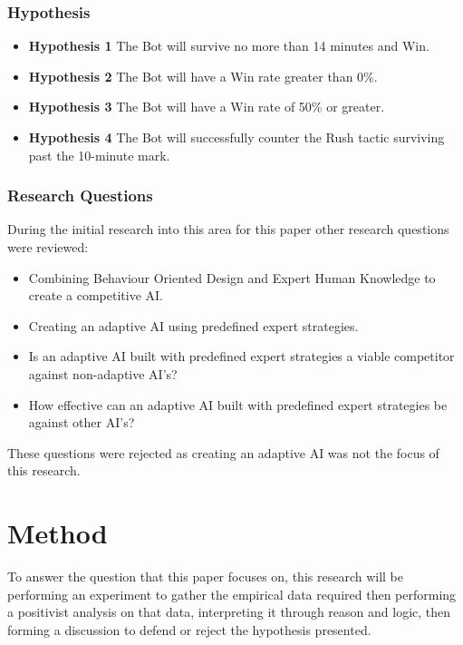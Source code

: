 \documentclass[journal]{IEEEtran}
\begin{document}
	\subsubsection{Hypothesis}
	\begin{itemize}
		\item \textbf{Hypothesis 1} The Bot will survive no more than 14 minutes and Win.
		\item \textbf{Hypothesis 2} The Bot will have a Win rate greater than 0\%.
		\item \textbf{Hypothesis 3} The Bot will have a Win rate of 50\% or greater.    
		\item \textbf{Hypothesis 4} The Bot will successfully counter the Rush tactic surviving past the 10-minute mark.
	\end{itemize}
	
	\subsubsection{Research Questions}
	During the initial research into this area for this paper other research questions were reviewed:
	\begin{itemize}
		\item Combining Behaviour Oriented Design and Expert Human Knowledge to create a competitive AI.
		
		\item Creating an adaptive AI using predefined expert strategies. 
		
		\item Is an adaptive AI built with predefined expert strategies a viable competitor against non-adaptive AI’s?
		
		\item How effective can an adaptive AI built with predefined expert strategies be against other AI’s?    
	\end{itemize}
	These questions were rejected as creating an adaptive AI was not the focus of this research.
	\newline
	
	\section{Method}
	To answer the question that this paper focuses on, this research will be performing an experiment to gather the empirical data required then performing a positivist analysis on that data, interpreting it through reason and logic, then forming a discussion to defend or reject the hypothesis presented.
	
\end{document}
